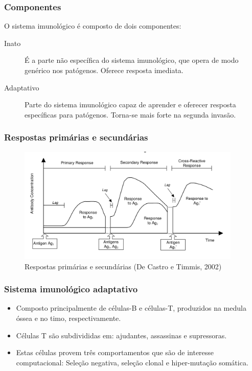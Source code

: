 \documentclass{beamer}
\begin{document}
\begin{frame}
    \frametitle{Componentes}
    
    O sistema imunológico é composto de dois componentes:
    
    \begin{description}
        \item[Inato] É a parte não específica do sistema imunológico, que opera
        de modo genérico nos patógenos. Oferece resposta imediata.
        \item[Adaptativo] Parte do sistema imunológico capaz de aprender e oferecer
        resposta específicas para patógenos. Torna-se mais forte na segunda 
        invasão.
    \end{description}
\end{frame}

\begin{frame}
    \frametitle{Respostas primárias e secundárias}
    
    \begin{figure}[!ht]
        \centering
        \includegraphics[width=0.95\textwidth]{memory}
        \caption{Respostas primárias e secundárias (De Castro e Timmis, 2002)}
    \end{figure}

\end{frame}

\begin{frame}
    \frametitle{Sistema imunológico adaptativo}
    
    \begin{itemize}
    \item Composto principalmente de células-B e células-T, produzidos na medula
    óssea e no timo, respectivamente.
    \item Células T são subdivididas em: ajudantes, assassinas e supressoras.
    \item Estas células provem três comportamentos que são de interesse computacional:
    Seleção negativa, seleção clonal e hiper-mutação somática.
    \end{itemize}
\end{frame}
\end{document}

